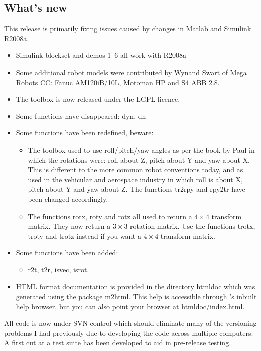 \documentclass{article}
\newcommand{\var}[1]{{\vtt #1}}
\begin{document}
\subsection{What's new}
This release is primarily fixing issues caused by changes in Matlab and Simulink
R2008a.
\begin{itemize}
\item	Simulink blockset and demos 1--6 all work with R2008a
\item   Some additional robot models were contributed by Wynand Swart of Mega Robots CC:
Fanuc AM120iB/10L, Motoman HP and S4 ABB 2.8.
\item   The toolbox is now released under the LGPL licence.
\item  Some functions have disappeared: \var{dyn}, \var{dh}
\item  Some functions have been redefined, beware:
\begin{itemize}
\item The toolbox used to use roll/pitch/yaw angles
as per the book by  Paul\cite{Paul81a} in which the rotations were: roll about Z, pitch about Y and yaw about X.
This is different to the more common robot conventions today, and as used in the vehicular and aerospace
industry in which roll is about X, pitch about Y and yaw about Z.  The functions
\var{tr2rpy} and \var{rpy2t}r have been changed accordingly.
\item The functions \var{rotx}, \var{roty} and \var{rotz} all used to return a $ 4 \times 4$ transform matrix.  They now return a $3 \times 3$ rotation
matrix.  Use the functions \var{trotx}, \var{troty} and \var{trotz} instead if you want a $ 4 \times 4$ transform matrix.
\end{itemize}
\item Some functions have been added:
\begin{itemize}
\item \var{r2t}, \var{t2r}, \var{isvec}, \var{isrot}.
\end{itemize}
\item HTML format documentation is provided in the directory \var{htmldoc} which was generated using the
package \var{m2html}.  This help is accessible through \Mlab's inbuilt help browser, but you can also point your
browser at \var{htmldoc/index.html}.
\end{itemize}

All code is now under SVN control which should eliminate many of the
versioning problems I had previously due to developing the code across 
multiple computers.
A first cut at a test suite has been developed to aid in pre-release testing.
\end{document}
